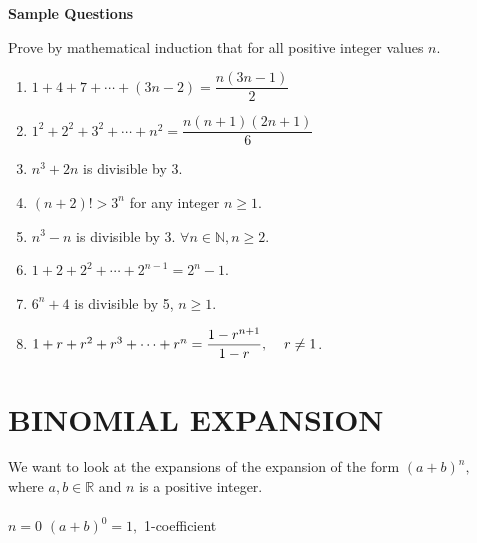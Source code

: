 \documentclass[11pt,a4paper]{article}
\begin{document}
\begin{center}
\textbf{Sample Questions}
\end{center}
Prove by mathematical induction that for all positive integer values $n$.
\begin{enumerate}
\item $1+4+7+\cdots +(3n-2)=\dfrac{n(3n-1)}{2}$\\

\item $1^2+2^2+3^2+\cdots +n^2=\dfrac{n(n+1)(2n+1)}{6}$\\

\item $n^3+2n$ is divisible by 3.\\

\item $(n+2)!>3^n$ for any integer $n\geq 1$.\\

\item $n^3-n$ is divisible by 3. $\forall n \in \mathbb{N}, n\geq 2$.\\

\item $1+2+2^2+\cdots +2^{n-1}=2^n-1$.\\

\item $6^n+4$ is divisible by 5, $n\geq 1$.\\

\item $1+r+r^2+r^3+\cdots +r^n=\dfrac{1-r^{n+1}}{1-r},\hspace{0.4cm} r\neq 1$.\\
\end{enumerate} 















\pagebreak
\section{BINOMIAL EXPANSION}
We want to look at the expansions of the expansion of the form $(a+b)^n,$ where $a,b\in \mathbb{R}$ and $n$ is a positive integer.\\\\

$n=0$\hspace{0.4cm} $(a+b)^0=1,$\hspace{0.4cm} 1-coefficient\\
\end{document}
